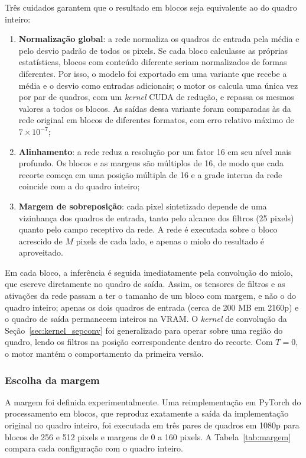 \documentclass[
    12pt,                %
    openright,           %
    oneside,             %
    a4paper,             %
    english,             %
    brazil               %
]{abntex2}
\begin{document}
Três cuidados garantem que o resultado em blocos seja equivalente ao do quadro inteiro:

\begin{enumerate}
    \item \textbf{Normalização global}: a rede normaliza os quadros de entrada pela média e pelo desvio padrão de todos os pixels. Se cada bloco calculasse as próprias estatísticas, blocos com conteúdo diferente seriam normalizados de formas diferentes. Por isso, o modelo foi exportado em uma variante que recebe a média e o desvio como entradas adicionais; o motor os calcula uma única vez por par de quadros, com um \textit{kernel} CUDA de redução, e repassa os mesmos valores a todos os blocos. As saídas dessa variante foram comparadas às da rede original em blocos de diferentes formatos, com erro relativo máximo de $7 \times 10^{-7}$;
    \item \textbf{Alinhamento}: a rede reduz a resolução por um fator 16 em seu nível mais profundo. Os blocos e as margens são múltiplos de 16, de modo que cada recorte começa em uma posição múltipla de 16 e a grade interna da rede coincide com a do quadro inteiro;
    \item \textbf{Margem de sobreposição}: cada pixel sintetizado depende de uma vizinhança dos quadros de entrada, tanto pelo alcance dos filtros (25 pixels) quanto pelo campo receptivo da rede. A rede é executada sobre o bloco acrescido de $M$ pixels de cada lado, e apenas o miolo do resultado é aproveitado.
\end{enumerate}

Em cada bloco, a inferência é seguida imediatamente pela convolução do miolo, que escreve diretamente no quadro de saída. Assim, os tensores de filtros e as ativações da rede passam a ter o tamanho de um bloco com margem, e não o do quadro inteiro; apenas os dois quadros de entrada (cerca de 200 MB em 2160p) e o quadro de saída permanecem inteiros na VRAM. O \textit{kernel} de convolução da Seção~\ref{sec:kernel_sepconv} foi generalizado para operar sobre uma região do quadro, lendo os filtros na posição correspondente dentro do recorte. Com $T = 0$, o motor mantém o comportamento da primeira versão.

\subsubsection{Escolha da margem}

A margem foi definida experimentalmente. Uma reimplementação em PyTorch do processamento em blocos, que reproduz exatamente a saída da implementação original no quadro inteiro, foi executada em três pares de quadros em 1080p para blocos de 256 e 512 pixels e margens de 0 a 160 pixels. A Tabela~\ref{tab:margem} compara cada configuração com o quadro inteiro.
\end{document}

